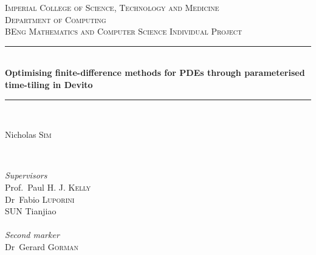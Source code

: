 \begin{titlepage} %
	\newcommand{\HRule}{\rule{\linewidth}{0.5mm}} %

	\centering %


	\textsc{\LARGE Imperial College of Science, Technology and Medicine}\\[1.5cm]

	\textsc{\large Department of Computing}\\[0.5cm] %
	
	\textsc{\large BEng Mathematics and Computer Science Individual Project}\\[0.5cm] %
	
	
	\HRule\\[0.4cm]
	
	{\huge\bfseries Optimising finite-difference methods for PDEs through parameterised time-tiling in Devito}\\[0.4cm] %
	
	\HRule\\[1.5cm]
	
	
	\begin{minipage}{0.4\textwidth}
		\begin{flushleft}
			\large
			Nicholas \textsc{Sim}
		\end{flushleft}
	\end{minipage}
	~
	\begin{minipage}{0.4\textwidth}
		\begin{flushright}
			\large
			\textit{Supervisors}\\
			Prof.~Paul H. J. \textsc{Kelly}\\
			Dr~Fabio \textsc{Luporini}\\
			\textsc{SUN} Tianjiao\\
			~\\
			\textit{Second marker}\\
			Dr~Gerard \textsc{Gorman}
		\end{flushright}
	\end{minipage}


\end{titlepage}
